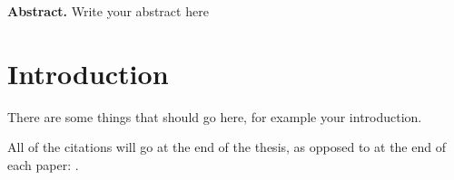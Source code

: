 \UseRawInputEncoding

\textbf{Abstract.} Write your abstract here

\section{Introduction}

There are some things that should go here, for example your introduction.

All of the citations will go at the end of the thesis, as opposed to at the end of each paper: \cite{borin_korp_2012}.